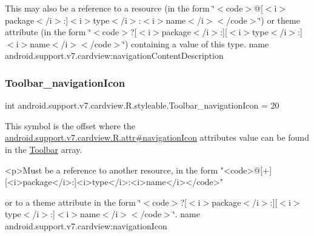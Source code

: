 This may also be a reference to a resource (in the form \char`\"{}$<$code$>$@\mbox{[}$<$i$>$package$<$/i$>$\+:\mbox{]}$<$i$>$type$<$/i$>$\+:$<$i$>$name$<$/i$>$$<$/code$>$\char`\"{}) or theme attribute (in the form \char`\"{}$<$code$>$?\mbox{[}$<$i$>$package$<$/i$>$\+:\mbox{]}\mbox{[}$<$i$>$type$<$/i$>$\+:\mbox{]}$<$i$>$name$<$/i$>$$<$/code$>$\char`\"{}) containing a value of this type.  name android.\+support.\+v7.\+cardview\+:navigation\+Content\+Description \mbox{\label{classandroid_1_1support_1_1v7_1_1cardview_1_1R_1_1styleable_af69916d5ccab7224ea96ec17a90ccc6a}} 
\subsubsection{\texorpdfstring{Toolbar\+\_\+navigation\+Icon}{Toolbar\_navigationIcon}}
{\footnotesize\ttfamily int android.\+support.\+v7.\+cardview.\+R.\+styleable.\+Toolbar\+\_\+navigation\+Icon = 20\hspace{0.3cm}{\ttfamily [static]}}

This symbol is the offset where the \hyperlink{classandroid_1_1support_1_1v7_1_1cardview_1_1R_1_1attr_af6d320e73203dd5ad5b891676fda2728}{android.\+support.\+v7.\+cardview.\+R.\+attr\#navigation\+Icon} attribute\textquotesingle{}s value can be found in the \hyperlink{classandroid_1_1support_1_1v7_1_1cardview_1_1R_1_1styleable_a26149aeb8fd339abe09ecc9d92b9304f}{Toolbar} array.

\begin{DoxyVerb}      <p>Must be a reference to another resource, in the form "<code>@[+][<i>package</i>:]<i>type</i>:<i>name</i></code>"
\end{DoxyVerb}
 or to a theme attribute in the form \char`\"{}$<$code$>$?\mbox{[}$<$i$>$package$<$/i$>$\+:\mbox{]}\mbox{[}$<$i$>$type$<$/i$>$\+:\mbox{]}$<$i$>$name$<$/i$>$$<$/code$>$\char`\"{}.  name android.\+support.\+v7.\+cardview\+:navigation\+Icon \mbox{\label{classandroid_1_1support_1_1v7_1_1cardview_1_1R_1_1styleable_a8d28e7c348452dd4d2e1736a96d0e624}} 

